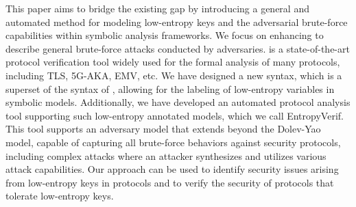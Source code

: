 \documentclass[../main.tex]{subfiles}  %
\begin{document}
This paper aims to bridge the existing gap by introducing a general and automated method for modeling low-entropy keys and the adversarial brute-force capabilities within symbolic analysis frameworks. 
We focus on enhancing \Tamarin{} to describe general brute-force attacks conducted by adversaries. 
\Tamarin{} is a state-of-the-art protocol verification tool widely used for the formal analysis of many protocols, including TLS\cite{cremers2017tls13}, 5G-AKA\cite{basin20185G, wang20215G}, EMV\cite{basin2021emv,radu2022emv}, etc.
We have designed a new syntax, which is a superset of the syntax of \Tamarin{}, allowing for the labeling of low-entropy variables in symbolic models. 
Additionally, we have developed an automated protocol analysis tool supporting such low-entropy annotated models, which we call EntropyVerif\cite{toolrepo}. 
This tool supports an adversary model that extends beyond the Dolev-Yao model, capable of capturing all brute-force behaviors against security protocols, including complex attacks where an attacker synthesizes and utilizes various attack capabilities.
Our approach can be used to identify security issues arising from low-entropy keys in protocols and to verify the security of protocols that tolerate low-entropy keys.
\end{document}
